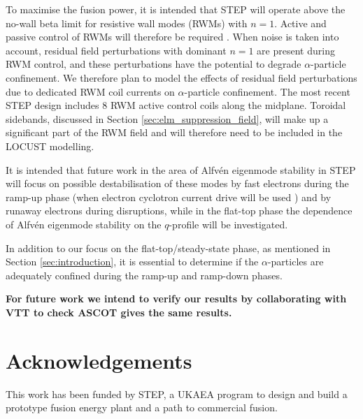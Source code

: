 \documentclass[10pt, a4paper, twoside]{article}
\begin{document}
To maximise the fusion power, it is intended that STEP will operate above the no-wall beta limit for resistive wall modes (RWMs) with $n=1$. Active and passive control of RWMs will therefore be required \cite{xia2023}. When noise is taken into account, residual field perturbations with dominant $n=1$ are present during RWM control, and these perturbations have the potential to degrade $\alpha$-particle confinement. We therefore plan to model the effects of residual field perturbations due to dedicated RWM coil currents on $\alpha$-particle confinement. The most recent STEP design includes 8 RWM active control coils along the midplane. Toroidal sidebands, discussed in Section \ref{sec:elm_suppression_field}, will make up a significant part of the RWM field and will therefore need to be included in the LOCUST modelling.

It is intended that future work in the area of Alfv\'en eigenmode stability in STEP will focus on possible destabilisation of these modes by fast electrons during the ramp-up phase (when electron cyclotron current drive will be used \cite{freethy2023}) and by runaway electrons during disruptions, while in the flat-top phase the dependence of Alfv\'en eigenmode stability on the $q$-profile will be investigated. 

In addition to our focus on the flat-top/steady-state phase, as mentioned in Section \ref{sec:introduction}, it is essential to determine if the $\alpha$-particles are adequately confined during the ramp-up and ramp-down phases.

\textbf{For future work we intend to verify our results by collaborating with VTT to check ASCOT gives the same results.}

\section*{Acknowledgements}

This work has been funded by STEP, a UKAEA program to design and build a prototype fusion energy plant and a path to commercial fusion.
\end{document}
